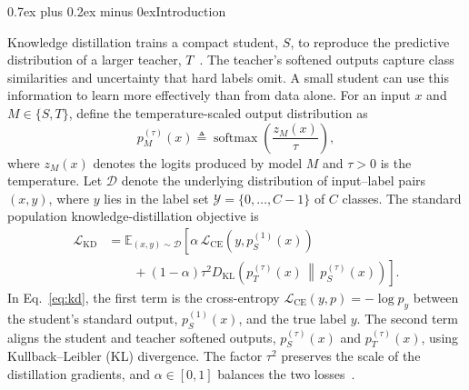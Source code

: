 \documentclass[10pt,journal,compsoc]{IEEEtran}
\makeatletter
\def\section{\@startsection{section}{1}{\z@}{-3.5ex plus -0.5ex minus -1.5ex}%
{0.7ex plus 0.2ex minus 0ex}{\normalfont\sublargesize\sffamily\bfseries\scshape}}
\theoremstyle{definition}
\makeatother
\begin{document}
\maketitle

\section{Introduction}
\label{sec:introduction}

Knowledge distillation trains a compact student, $S$, to reproduce the
predictive distribution of a larger teacher, $T$~\cite{gou2021knowledge}. The
teacher's softened outputs capture class similarities and uncertainty that hard
labels omit. A small student can use this information to learn more effectively
than from data alone. For an input $x$ and $M\in\{S,T\}$, define the
temperature-scaled output distribution as
\begin{equation}
\label{eq:softmax-temperature}
p_M^{(\tau)}(x) \triangleq
\operatorname{softmax}\!\left(\frac{z_M(x)}{\tau}\right),
\end{equation}
where $z_M(x)$ denotes the logits produced by model $M$ and $\tau>0$ is the
temperature. Let $\mathcal{D}$ denote the underlying distribution of
input--label pairs $(x,y)$, where $y$ lies in the label set
$\mathcal{Y}=\{0,\ldots,C-1\}$ of $C$ classes. The standard
population knowledge-distillation objective is
\begin{equation}
\label{eq:kd}
\begin{aligned}
\mathcal{L}_{\mathrm{KD}}
&= \mathbb{E}_{(x,y)\sim\mathcal{D}}\!\left[
\alpha\,\mathcal{L}_{\mathrm{CE}}\!\left(y, p_S^{(1)}(x)\right)\right. \\
&\qquad\left. {}+ (1-\alpha)\tau^2 D_{\mathrm{KL}}\!\left(
p_T^{(\tau)}(x)\,\middle\|\,p_S^{(\tau)}(x)
\right)\right].
\end{aligned}
\end{equation}
In Eq.~\eqref{eq:kd}, the first term is the cross-entropy
$\mathcal{L}_{\mathrm{CE}}(y,p)=-\log p_y$ between the student's standard
output, $p_S^{(1)}(x)$, and the true label $y$. The second term aligns the student and teacher softened
outputs, $p_S^{(\tau)}(x)$ and $p_T^{(\tau)}(x)$, using Kullback--Leibler (KL)
divergence. The factor $\tau^2$ preserves the scale of the distillation
gradients, and $\alpha\in[0,1]$ balances the two
losses~\cite{hinton2015distilling}.
\end{document}
